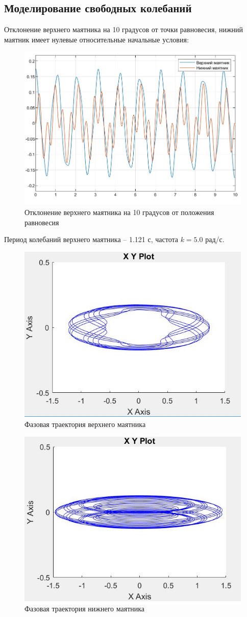 \documentclass{article}
\begin{document}
	\subsection*{Моделирование свободных колебаний}
	Отклонение верхнего маятника на 10 градусов от точки равновесия, нижний маятник имеет нулевые относительные начальные условия:
	\begin{figure}[H]
		\centering
		\includegraphics[width=0.7\linewidth]{up10}
		\caption{Отклонение верхнего маятника на 10 градусов от положения равновесия}
		\label{fig:up10}
	\end{figure}
	Период колебаний верхнего маятника -- 1.121 с, частота $k = 5.0$ рад/с.
	\begin{figure}[H]
		\centering
		\includegraphics[width=0.7\linewidth]{upper10}
		\caption{Фазовая траектория верхнего маятника}
		\label{fig:upper10}
	\end{figure}
	\begin{figure}[H]
		\centering
		\includegraphics[width=0.7\linewidth]{lower0_10}
		\caption{Фазовая траектория нижнего маятника}
		\label{fig:lower010}
	\end{figure}
\end{document}

